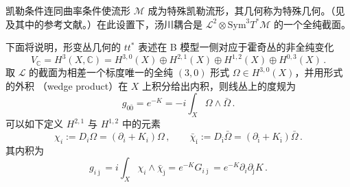 凯勒条件连同曲率条件使流形 $\mathcal{M}$ 成为特殊凯勒流形，其几何称为特殊几何。（见
\cite{ref56,ref51,ref71,ref59} 及其中的参考文献。）在此设置下，汤川耦合是 $\mathcal{L}^2\otimes\mathrm{Sym}^3T^*
\mathcal{M}$ 的一个全纯截面。

下面将说明，形变丛几何的 $tt^*$ 表述在 B 模型一侧对应于霍奇丛的非全纯变化
\begin{equation}
  V_{\mathbb{C}}=H^3(X,\mathbb{C})=H^{3,0}(X)\oplus H^{2,1}(X)\oplus H^{1,2}(X)
  \oplus H^{0,3}(X)\,.
  \tag{4.12}
  \label{eq:4.12}
\end{equation}
取 $\mathcal{L}$ 的截面为相差一个标度唯一的全纯 $(3,0)$ 形式 $\Omega\in H^{3,0}(X)$，并用形式的外积
（wedge product）在 $X$ 上积分给出内积，则线丛上的度规为
\begin{equation}
  g_{0\bar 0}=e^{-K}=-i\int_X\Omega\wedge\bar\Omega\,.
  \tag{4.13}
  \label{eq:4.13}
\end{equation}
可以如下定义 $H^{2,1}$ 与 $H^{1,2}$ 中的元素
\begin{equation}
  \chi_i:=D_i\Omega=(\partial_i+K_i)\Omega\,,\qquad
  \bar\chi_{\bar\imath}:=D_{\bar\imath}\bar\Omega
  =(\partial_{\bar\imath}+K_{\bar\imath})\bar\Omega\,.
  \tag{4.14}
  \label{eq:4.14}
\end{equation}
其内积为
\begin{equation}
  g_{i\bar\jmath}=i\int_X\chi_i\wedge\bar\chi_{\bar\jmath}
  =e^{-K}G_{i\bar\jmath}=e^{-K}\partial_i\partial_{\bar\jmath}K\,.
  \tag{4.15}
  \label{eq:4.15}
\end{equation}


